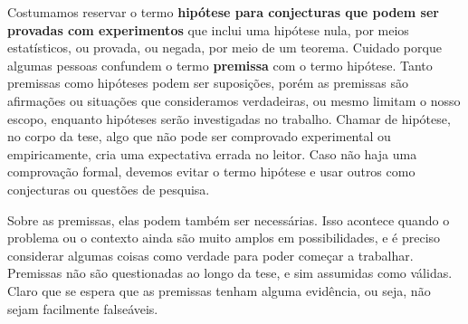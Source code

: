 Costumamos reservar o termo \textbf{hipótese para conjecturas que podem ser provadas com experimentos} que inclui uma hipótese nula, por meios estatísticos, ou provada, ou negada, por meio de um teorema.
Cuidado porque algumas pessoas confundem o termo \textbf{premissa} com o termo hipótese. Tanto premissas como hipóteses podem ser suposições, porém as premissas são afirmações ou situações que consideramos verdadeiras, ou mesmo limitam o nosso escopo, enquanto hipóteses serão investigadas no trabalho.
Chamar de hipótese, no corpo da tese, algo que não pode ser comprovado experimental ou empiricamente, cria uma expectativa errada no leitor. 
Caso não haja uma comprovação formal, devemos evitar o termo hipótese e usar outros como conjecturas ou questões de pesquisa.

Sobre as premissas, elas podem também ser necessárias. Isso acontece quando o problema ou o contexto ainda são muito amplos em possibilidades, e é preciso considerar algumas coisas como verdade para poder começar a trabalhar. Premissas não são questionadas ao longo da tese, e sim assumidas como válidas. Claro que se espera que as premissas tenham alguma evidência, ou seja, não sejam facilmente falseáveis.



